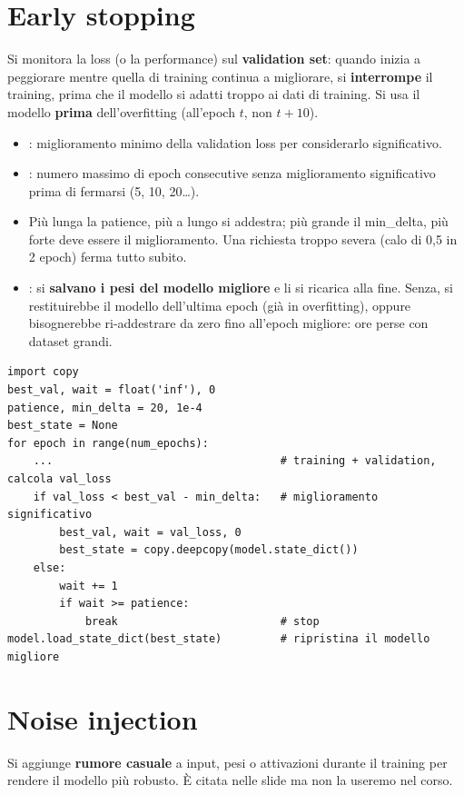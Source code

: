 \section{Early stopping}
Si monitora la loss (o la performance) sul \textbf{validation set}: quando inizia a peggiorare mentre quella di training continua a
migliorare, si \textbf{interrompe} il training, prima che il modello si adatti troppo ai dati di training. Si usa il modello
\textbf{prima} dell'overfitting (all'epoch $t$, non $t+10$).
\begin{itemize}
  \item {}: miglioramento minimo della validation loss per considerarlo significativo.
  \item {}: numero massimo di epoch consecutive senza miglioramento significativo prima di fermarsi (5, 10, 20\ldots).
  \item Più lunga la patience, più a lungo si addestra; più grande il min\_delta, più forte deve essere il miglioramento.
        Una richiesta troppo severa (calo di 0,5 in 2 epoch) ferma tutto subito.
  \item {}: si \textbf{salvano i pesi del modello migliore} e li si ricarica alla fine. Senza, si
        restituirebbe il modello dell'ultima epoch (già in overfitting), oppure bisognerebbe ri-addestrare da zero fino all'epoch
        migliore: ore perse con dataset grandi.
\end{itemize}
\begin{lstlisting}
import copy
best_val, wait = float('inf'), 0
patience, min_delta = 20, 1e-4
best_state = None
for epoch in range(num_epochs):
    ...                                   # training + validation, calcola val_loss
    if val_loss < best_val - min_delta:   # miglioramento significativo
        best_val, wait = val_loss, 0
        best_state = copy.deepcopy(model.state_dict())
    else:
        wait += 1
        if wait >= patience:
            break                         # stop
model.load_state_dict(best_state)         # ripristina il modello migliore
\end{lstlisting}

\section{Noise injection}\label{sec:noise-injection}
Si aggiunge \textbf{rumore casuale} a input, pesi o attivazioni durante il training per rendere il modello più robusto.
È citata nelle slide ma non la useremo nel corso.

